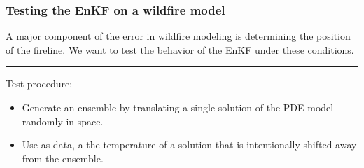 \documentclass{beamer}
\begin{document}
\begin{frame}
\frametitle{Testing the EnKF on a wildfire model}
A major component of the error in wildfire modeling is determining the 
\alert{position} of the fireline.  We want to test the behavior of the EnKF
under these conditions.\\
\vspace{.25in}
\hrule
\vspace{.25in}
Test procedure:
\begin{itemize}
\item Generate an ensemble by translating a single solution of the PDE model
randomly in space.
\item Use as data, a the temperature of a solution that is 
intentionally shifted away from the ensemble.
\end{itemize}
\end{frame}
\end{document}
